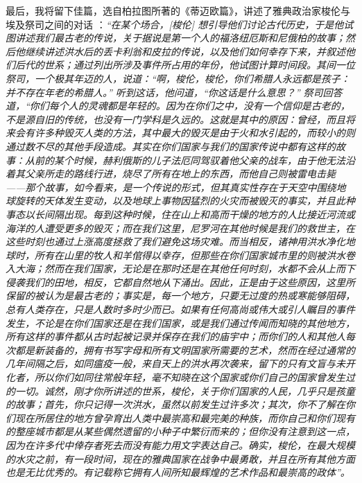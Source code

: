 \documentclass[10pt,twocolumn,letterpaper]{article}
\begin{document}
最后，我将留下佳篇，选自柏拉图所著的《蒂迈欧篇》，讲述了雅典政治家梭伦与埃及祭司之间的对话 \cite{140}：\textit{“在某个场合，[梭伦] 想引导他们讨论古代历史，于是他试图讲述我们最古老的传说，关于据说是第一个人的福洛纽厄斯和尼俄柏的故事；然后他继续讲述洪水后的丢卡利翁和皮拉的传说，以及他们如何幸存下来，并叙述他们后代的世系；通过列出所涉及事件所占用的年份，他试图计算时间段。其间一位祭司，一个极其年迈的人，说道：“啊，梭伦，梭伦，你们希腊人永远都是孩子：并不存在年老的希腊人。” 听到这话，他问道，“你这话是什么意思？” 祭司回答道，“你们每个人的灵魂都是年轻的。因为在你们之中，没有一个信仰是古老的，不是源自旧的传统，也没有一门学科是久远的。这就是其中的原因：曾经，而且将来会有许多种毁灭人类的方法，其中最大的毁灭是由于火和水引起的，而较小的则通过数不尽的其他手段造成。其实在你们国家与我们的国家传说中都有这样的故事：从前的某个时候，赫利俄斯的儿子法厄同驾驭着他父亲的战车，由于他无法沿着其父亲所走的路线行进，烧尽了所有在地上的东西，而他自己则被雷电击毙——那个故事，如今看来，是一个传说的形式，但其真实性存在于天空中围绕地球旋转的天体发生变动，以及地球上事物因猛烈的火灾而被毁灭的事实，并且此种事态以长间隔出现。每到这种时候，住在山上和高而干燥的地方的人比接近河流或海洋的人遭受更多的毁灭；而在我们这里，尼罗河在其他时候是我们的救世主，在这些时刻也通过上涨高度拯救了我们避免这场灾难。而当相反，诸神用洪水净化地球时，所有在山里的牧人和羊倌得以幸存，但那些在你们国家城市里的则被洪水卷入大海；然而在我们国家，无论是在那时还是在其他任何时刻，水都不会从上而下侵袭我们的田地，相反，它都自然地从下涌出。因此，正是由于这些原因，这里所保留的被认为是最古老的；事实是，每一个地方，只要无过度的热或寒能够阻碍，总有人类存在，只是人数时多时少而已。如果有任何高尚或伟大或引人瞩目的事件发生，不论是在你们国家还是在我们国家，或是我们通过传闻而知晓的其他地方，所有这样的事件都从古时起被记录并保存在我们的庙宇中；而你们的人和其他人每次都是新装备的，拥有书写字母和所有文明国家所需要的艺术，然而在经过通常的几年间隔之后，如同瘟疫一般，来自天上的洪水再次袭来，留下的只有文盲与未开化者，所以你们如同往常般年轻，毫不知晓在这个国家或你们自己的国家曾发生过的一切。诚然，刚才你所讲述的世系，梭伦，关于你们国家的人民，几乎只是孩童的故事；首先，你只记得一次洪水，虽然以前发生过许多次；其次，你不了解在你们现在所居住的地方曾孕育出人类中最崇高和最完美的种族，而你自己和你们现有的整座城市都是从某些偶然遗留的小种子中繁衍而来的；但你没有注意到这一点，因为在许多代中倖存者死去而没有能力用文字表达自己。确实，梭伦，在最大规模的水灾之前，有一段时间，现在的雅典国家在战争中最勇敢，并且在所有其他方面也是无比优秀的。有记载称它拥有人间所知最辉煌的艺术作品和最崇高的政体”。}
\end{document}
